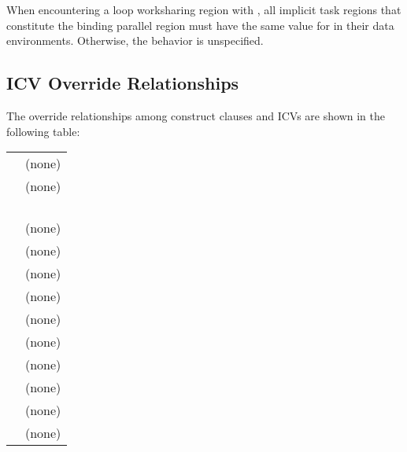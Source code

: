 When encountering a loop worksharing region with , all 
implicit task regions that constitute the binding parallel region must have the same value 
for  in their data environments. Otherwise, the behavior is unspecified.








\subsection{ICV Override Relationships}
\label{subsec:ICV Override Relationships}
The override relationships among construct clauses and ICVs are shown in the following 
table:

\nolinenumbers
\renewcommand{\arraystretch}{1.5}
\tablelasttail{\hline}
\begin{supertabular}{ p{1.3in} p{2.0in}}
 & (none)\\
 & (none)\\
 & \\
 & \\
 & \\
 & \\
 & (none)\\
 & (none)\\
 & (none)\\
 & (none)\\
 & (none)\\
 & (none)\\
 & (none)\\
 & (none)\\
 & (none)\\
 & (none)\\
\end{supertabular}
\linenumbers


